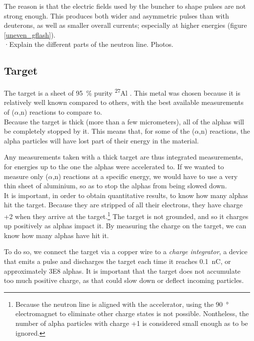 \documentclass[a4paper,12pt]{report}
\newcommand{\an}{($\alpha$,n) }
\newcommand{\Aliso}{\textsuperscript{27}Al }
\begin{document}
The reason is that the electric fields used by the buncher to shape pulses are not strong enough.
This produces both wider and asymmetric pulses than with deuterons, as well as smaller overall currents; especially at higher energies (figure \ref{uneven_gflash}).
\\

·Explain the different parts of the neutron line. Photos.\\

\subsection{Target}
The target is a sheet of \qty{95}{\percent} purity \Aliso.	%
This metal was chosen because it is relatively well known compared to others, with the best available measurements of \an reactions to compare to.
\\

Because the target is thick (more than a few micrometers), all of the alphas will be completely stopped by it.
This means that, for some of the \an reactions, the alpha particles will have lost part of their energy in the material.

Any measurements taken with a thick target are thus integrated measurements, for energies up to the one the alphas were accelerated to.
If we wanted to measure only \an reactions at a specific energy, we would have to use a very thin sheet of aluminium, so as to stop the alphas from being slowed down.
\\

It is important, in order to obtain quantitative results, to know how many alphas hit the target.
Because they are stripped of all their electrons, they have charge +2 when they arrive at the target.\footnote{Because the neutron line is aligned with the accelerator, using the \qty{90}{\degree} electromagnet to eliminate other charge states is not possible. Nontheless, the number of alpha particles with charge +1 is considered small enough as to be ignored.}
The target is not grounded, and so it charges up positively as alphas impact it.
By measuring the charge on the target, we can know how many alphas have hit it.

To do so, we connect the target via a copper wire to a \emph{charge integrator}, a device that emits a pulse and discharges the target each time it reaches \qty{0.1}{\nano\coulomb}, or approximately \num{3E8} alphas.
It is important that the target does not accumulate too much positive charge, as that could slow down or deflect incoming particles.
\end{document}
